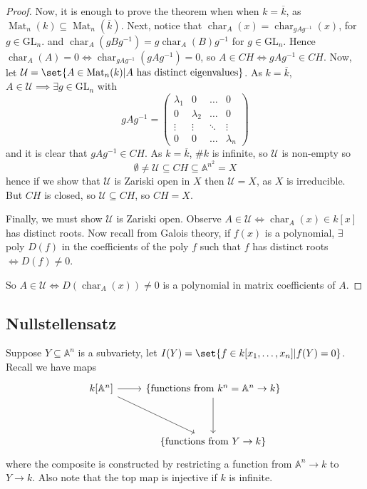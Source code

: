\documentclass{article}
\newcommand{\A}{\mathbb{A}}
\DeclareMathOperator{\Mat}{Mat}
\DeclareMathOperator{\chara}{char}
\begin{document}
\begin{proof}
    Now, it is enough to prove the theorem when when $k = \overline{k}$, as $\Mat_n(k) \subseteq \Mat_n(\overline{k})$.
    Next, notice that $\chara_A(x) = \chara_{g A g^{-1}} (x)$, for $g \in \text{GL}_n$. and $\chara_A(g B g^{-1}) = g \chara_A(B) g^{-1}$ for $g \in \text{GL}_n$.
    Hence $\chara_A(A) = 0 \iff \chara_{g A g^{-1}}(g A g^{-1}) = 0$, so
    $A \in CH \iff g A g^{-1} \in CH$.
    Now, let $\mathcal{U} = \set{A \in \Mat_n(k) | A \text{ has distinct eigenvalues}}$. As $k = \overline{k}$, $A \in \mathcal{U} \implies \exists g \in \text{GL}_n$ with
    \begin{equation*}
        g A g^{-1} = \begin{pmatrix}
            \lambda_1 & 0 & \dots & 0 \\
            0 & \lambda_2 & \dots & 0 \\
            \vdots & \vdots & \ddots & \vdots \\
            0 & 0 & \dots & \lambda_n
        \end{pmatrix}
    \end{equation*}
    and it is clear that $g A g^{-1} \in CH$.
    As $k = \overline{k}$, $\#k$ is infinite, so $\mathcal{U}$ is non-empty so
    \begin{equation*}
        \emptyset \neq \mathcal{U} \subseteq CH \subseteq \A^{n^2} = X
    \end{equation*}
    hence if we show that $\mathcal{U}$ is Zariski open in $X$ then $\mathcal{U} = X$, as $X$ is irreducible. But $CH$ is closed, so $\mathcal{U} \subseteq CH$, so $CH=X$.

    Finally, we must show $\mathcal{U}$ is Zariski open.
    Observe $A \in \mathcal{U} \iff \chara_A(x) \in k[x]$ has distinct roots.
    Now recall from Galois theory, if $f(x)$ is a polynomial, $\exists$ poly $D(f)$ in the coefficients of the poly $f$ such that $f$ has distinct roots $\iff D(f) \neq 0$.

    So $A \in \mathcal{U} \iff D(\chara_A(x)) \neq 0$ is a polynomial in matrix coefficients of $A$.
\end{proof}

\color{black}
\subsection{Nullstellensatz}
Suppose $Y \subseteq \A^n$ is a subvariety,
let $I(Y) = \set{f \in k[x_1, \dotsc, x_n] | f(Y) = 0}$.
Recall we have maps
\begin{equation*}
    \begin{tikzcd}
        k[\A^n] \arrow[r] \arrow[rdd] & \{\text{functions from } k^n = \A^n \to k\} \arrow[dd] \\
                                     &\\
                         & \{\text{functions from } Y \to k\}
    \end{tikzcd}
\end{equation*}
where the composite is constructed by restricting a function from $\A^n \to k$ to $Y \to k$.
Also note that the top map is injective if $k$ is infinite.
\end{document}
